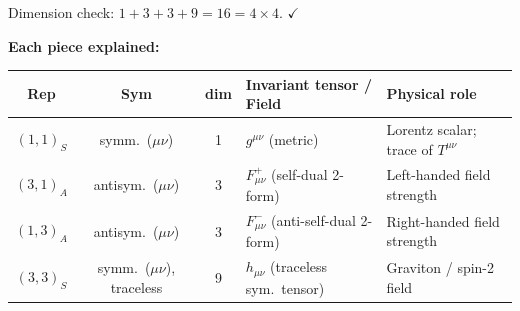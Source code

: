 \documentclass[12pt]{article}
\theoremstyle{remark}
\begin{document}
Dimension check: $1 + 3 + 3 + 9 = 16 = 4\times 4$. $\checkmark$

\medskip
\noindent\textbf{Each piece explained:}

\begin{center}
\renewcommand{\arraystretch}{1.5}
\begin{tabular}{@{}cccll@{}}
  \toprule
  Rep & Sym & dim & Invariant tensor / Field & Physical role \\
  \midrule
  $(1,1)_S$ & symm.\ ($\mu\nu$) & 1
    & $g^{\mu\nu}$ (metric) & Lorentz scalar; trace of $T^{\mu\nu}$ \\
  $(3,1)_A$ & antisym.\ ($\mu\nu$) & 3
    & $F^+_{\mu\nu}$ (self-dual 2-form) & Left-handed field strength \\
  $(1,3)_A$ & antisym.\ ($\mu\nu$) & 3
    & $F^-_{\mu\nu}$ (anti-self-dual 2-form) & Right-handed field strength \\
  $(3,3)_S$ & symm.\ ($\mu\nu$), traceless & 9
    & $h_{\mu\nu}$ (traceless sym.\ tensor) & Graviton / spin-2 field \\
  \bottomrule
\end{tabular}
\end{center}
\end{document}
